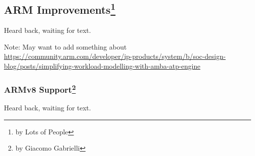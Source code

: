 \subsection[ARM Improvements]{ARM Improvements\footnote{by Lots of People}}

Heard back, waiting for text.

Note: May want to add something about \url{https://community.arm.com/developer/ip-products/system/b/soc-design-blog/posts/simplifying-workload-modelling-with-amba-atp-engine}

\subsubsection[ARMv8 Support]{ARMv8 Support\footnote{by Giacomo Gabrielli}}

Heard back, waiting for text.

